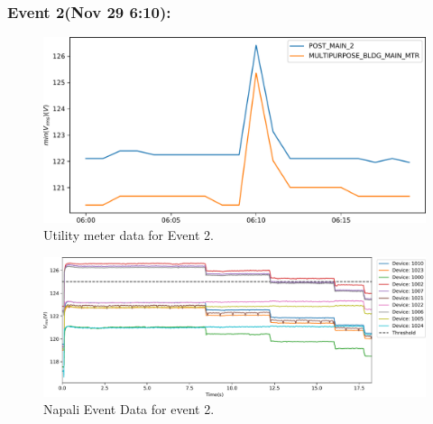 \subsubsection{Event 2(Nov 29 6:10):}
\begin{figure}[!ht]
    \centering
    \includegraphics[width=0.7\linewidth]{img/napali_eval/subthreshold/ev2/ev2_gt.pdf}
    \caption{Utility meter data for Event 2.}
    \label{expdes:fig:sub:ev2:gt}
\end{figure}
\begin{figure}[!ht]
    \centering
    \includegraphics[width=1\linewidth]{img/napali_eval/subthreshold/ev2/boxes_combined.pdf}
    \caption{Napali Event Data for event 2.}
    \label{expdes:fig:sub:ev2:boxes}
\end{figure}
